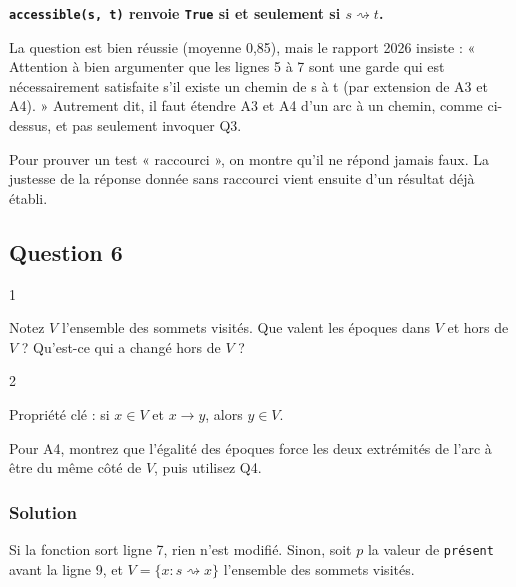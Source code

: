 \documentclass[11pt,a4paper]{article}
\begin{document}
\textbf{\texttt{accessible(s,\ t)} renvoie \texttt{True} si et seulement si \(s\rightsquigarrow t\).}

\begin{jury}

La question est bien réussie (moyenne 0,85), mais le rapport 2026 insiste : « Attention à bien argumenter que les lignes 5 à 7 sont une garde qui est nécessairement satisfaite s'il existe un chemin de s à t (par extension de A3 et A4). » Autrement dit, il faut étendre A3 et A4 d'un arc à un chemin, comme ci-dessus, et pas seulement invoquer Q3.

\end{jury}

\begin{methode}

Pour prouver un test « raccourci », on montre qu'il ne répond jamais faux. La justesse de la réponse donnée sans raccourci vient ensuite d'un résultat déjà établi.

\end{methode}

\hypertarget{question-6}{%
\subsection{Question 6}\label{question-6}}

\begin{indication}{1}

Notez \(V\) l'ensemble des sommets visités. Que valent les époques dans \(V\) et hors de \(V\) ? Qu'est-ce qui a changé hors de \(V\) ?

\end{indication}

\begin{indication}{2}

Propriété clé : si \(x\in V\) et \(x\to y\), alors \(y\in V\).

Pour A4, montrez que l'égalité des époques force les deux extrémités de l'arc à être du même côté de \(V\), puis utilisez Q4.

\end{indication}

\hypertarget{solution-5}{%
\subsubsection{Solution}\label{solution-5}}

Si la fonction sort ligne 7, rien n'est modifié. Sinon, soit \(p\) la valeur de \texttt{présent} avant la ligne 9, et \(V=\{x : s\rightsquigarrow x\}\) l'ensemble des sommets visités.
\end{document}
